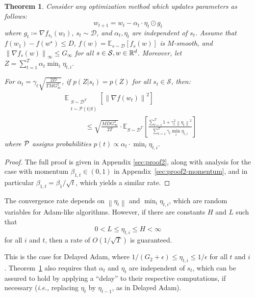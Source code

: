 \documentclass{article}
\newtheorem{thm}{Theorem}
\newcommand{\ie}{\textit{i.e.,} }
\newcommand{\norm}[1]{\left\lVert{#1}\right\rVert}
\newcommand{\thmref}[1]{Theorem~\ref{#1}}
\newcommand{\currw}{w_t}
\newcommand{\nextw}{w_{t+1}}
\newcommand{\w}{w}
\newcommand{\fs}{f_s}
\newcommand{\fst}{f_{s_t}}
\newcommand{\currg}{g_t}
\newcommand{\preve}{\eta_{t-1}}
\newcommand{\curre}{\eta_t}
\newcommand{\currei}{\eta_{t,i}}
\newcommand{\curra}{\alpha_t}
\newcommand{\normed}[1]{\left\lVert {#1} \right\rVert}
\newcommand{\bone}{\beta_1}
\newcommand{\bonet}{\beta_{1,t}}
\newcommand{\fdist}{D}
\newcommand{\smooth}{M}
\newcommand{\lowinf}{L}
\newcommand{\highinf}{H}
\newcommand{\gradb}{G_\infty}
\newcommand{\gradbtwo}{G_2}
\newcommand{\supp}{\mathcal S}
\newcommand{\expec}[2]{\mathbb E_{#1} \left[ {#2} \right]}
\newcommand{\algrand}{\substack{S \sim \dist^T \\ t \sim \mathcal P(t|S)}}
\newcommand{\dist}{\mathcal D}
\begin{document}
\begin{thm}
   \label{thm:dadamconv}
   Consider any optimization method which updates parameters as follows:
   \begin{equation}
      \nextw = \currw - \curra \cdot \curre \odot \currg
   \end{equation}
   where $\currg \coloneqq \nabla \fst(\currw)$, $s_t \sim \dist$, and
   $\curra, \curre$ are independent of $s_t$. Assume that $f(\w_1) - f(\w^\star) \leq \fdist$,
   $f(w) = \expec{s \sim \dist}{\fs(\w)}$ is $\smooth$-smooth, and
   $\normed{\nabla \fs (\w)}_\infty \leq \gradb$ for all
   $s \in \supp, w \in \R^d$.
   Moreover, let $Z = \sum_{t=1}^T \alpha_t \min_i \currei$.

   For $\curra = \gamma_t \sqrt{\frac{2 \fdist}{T \smooth \gradb^2}}$,
   if $p(Z|s_t) = p(Z)$ for all $s_t \in \supp$, then:
   \begin{equation}
   \begin{split}
      & \expec{\algrand}{\normed{\nabla f(\currw)}^2} \\
         & \quad\quad\quad \leq \sqrt{\frac{\smooth \fdist \gradb^2}{2T}} \cdot
            \expec{S \sim \dist^T}{\frac{\sum_{t=1}^T 1 +
               \gamma_t^2 \norm{\curre}^2}{\sum_{t=1}^T \gamma_t \min_i \currei}}
   \end{split}
   \label{eq:convrate}
   \end{equation}
   where $\cal P$ assigns probabilities
      $p(t) \propto \curra \cdot \min_i \currei$.
\end{thm}
\begin{proof}
   The full proof is given in Appendix \ref{sec:proof2}, along with analysis
   for the case with momentum $\bonet \in (0,1)$ in
   Appendix~\ref{sec:proof2-momentum}, and in particular
   $\bonet = \bone / \sqrt t$, which yields a similar rate.
\end{proof}

The convergence rate depends on $\norm{\curre}$ and $\min_i \currei$, which are
random variables for Adam-like algorithms.  However, if there are constants
$\highinf$ and $\lowinf$ such that
\begin{equation}
0 < \lowinf \leq \currei \leq \highinf < \infty
\end{equation}
for all $i$ and $t$, then a
rate of $O(1 / \sqrt T)$ is guaranteed.

This is the case for Delayed Adam,
where $1/(\gradbtwo + \epsilon) \leq \currei \leq 1 / \epsilon$ for all $t$ and
$i$.  \thmref{thm:dadamconv} also requires that $\curra$ and $\curre$ are
independent of $s_t$, which can be assured to hold by applying a ``delay'' to
their respective computations, if necessary (\ie replacing $\curre$ by
$\preve$, as in Delayed Adam).
\end{document}
